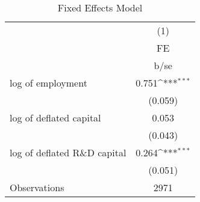 \begin{table}[htbp]\centering
\def\sym#1{\ifmmode^{#1}\else\(^{#1}\)\fi}
\caption{ Fixed Eﬀects Model}
\begin{tabular}{l*{1}{c}}
\toprule
                    &\multicolumn{1}{c}{(1)}\\
                    &\multicolumn{1}{c}{FE}\\
                    &        b/se         \\
\midrule
log of employment   &       0.751\sym{***}\\
                    &     (0.059)         \\
log of deflated capital&       0.053         \\
                    &     (0.043)         \\
log of deflated R\&D capital&       0.264\sym{***}\\
                    &     (0.051)         \\
\midrule
Observations        &        2971         \\
\bottomrule
\end{tabular}
\end{table}
